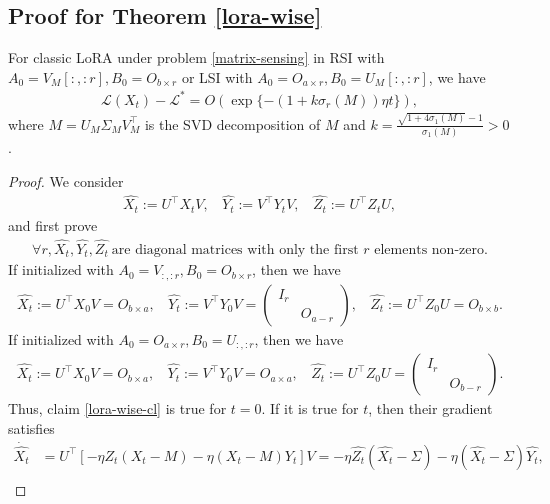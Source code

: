 \subsection{Proof for Theorem \ref{lora-wise}}
\label{lora-wise-proof}
\begin{theorem}
    For classic LoRA under problem \ref{matrix-sensing} in RSI with $A_0=V_M[:,:r],B_0=O_{b\times r}$ or LSI with $A_0=O_{a\times r},B_0=U_M[:,:r]$, we have
    \begin{align*}
        \mathcal{L}(X_t)-\mathcal{L}^*=O(\exp\{-(1+k\sigma_r(M))\eta t\}),
    \end{align*}
    where $M=U_M\Sigma_MV_M^\top$ is the SVD decomposition of $M$ and $k=\frac{\sqrt{1+4\sigma_1(M)}-1}{\sigma_1(M)}>0$.
\end{theorem}
\begin{proof}
    We consider
    \begin{align}
        \hat{X_t}:=U^\top X_tV,~~~~\hat{Y_t}:=V^\top Y_tV,~~~~\hat{Z_t}:=U^\top Z_tU,
    \end{align}
    and first prove 
    \begin{align}
        \forall r, \hat{X_t},\hat{Y_t},\hat{Z_t}~\text{are diagonal matrices with only the first $r$ elements non-zero.}\label{lora-wise-cl}
    \end{align}If initialized with $A_0=V_{:,:r},B_0=O_{b\times r}$, then we have 
    \begin{align}
        \hat{X_t}:=U^\top X_0V=O_{b\times a},~~~~\hat{Y_t}:=V^\top Y_0V=\begin{pmatrix}
            I_r\\&O_{a-r}
        \end{pmatrix},~~~~\hat{Z_t}:=U^\top Z_0U=O_{b\times b}.
    \end{align}
    If initialized with $A_0=O_{a\times r},B_0=U_{:,:r}$, then we have 
    \begin{align}
        \hat{X_t}:=U^\top X_0V=O_{b\times a},~~~~\hat{Y_t}:=V^\top Y_0V=O_{a\times a},~~~~\hat{Z_t}:=U^\top Z_0U=\begin{pmatrix}
            I_r\\&O_{b-r}
        \end{pmatrix}.
    \end{align}
    Thus, claim \ref{lora-wise-cl} is true for $t=0$. If it is true for $t$, then their gradient satisfies
    \begin{align}
        \dot{\hat{X_t}}&=U^\top\left[-\eta Z_t(X_t-M)-\eta (X_t-M)Y_t\right]V=-\eta \hat{Z_t}(\hat{X_t}-\Sigma)-\eta (\hat{X_t}-\Sigma)\hat{Y_t},\\

\end{align}
\end{proof}
